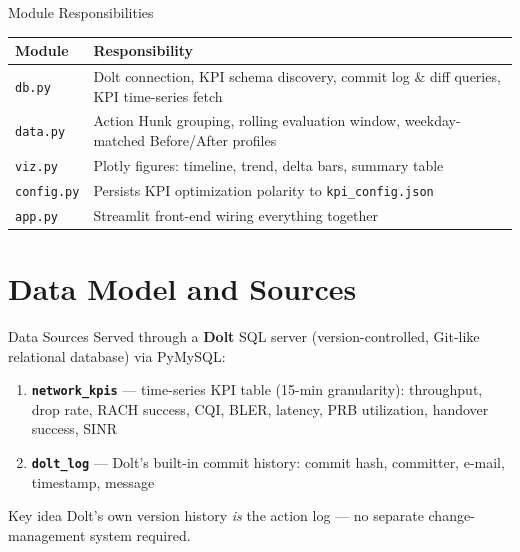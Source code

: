 \documentclass[aspectratio=169]{beamer}
\begin{document}
\begin{frame}{Module Responsibilities}
    \small
    \begin{tabular}{@{}p{2.2cm}p{8.8cm}@{}}
        \toprule
        \textbf{Module} & \textbf{Responsibility} \\
        \midrule
        \texttt{db.py}     & Dolt connection, KPI schema discovery, commit
                              log \& diff queries, KPI time-series fetch \\
        \texttt{data.py}   & Action Hunk grouping, rolling evaluation
                              window, weekday-matched Before/After
                              profiles \\
        \texttt{viz.py}    & Plotly figures: timeline, trend, delta bars,
                              summary table \\
        \texttt{config.py} & Persists KPI optimization polarity to
                              \texttt{kpi\_config.json} \\
        \texttt{app.py}    & Streamlit front-end wiring everything
                              together \\
        \bottomrule
    \end{tabular}
\end{frame}

\section{Data Model and Sources}

\begin{frame}{Data Sources}
    Served through a \textbf{Dolt} SQL server (version-controlled,
    Git-like relational database) via PyMySQL:
    \begin{enumerate}
        \item \textbf{\texttt{network\_kpis}} --- time-series KPI table
              (15-min granularity): throughput, drop rate, RACH success,
              CQI, BLER, latency, PRB utilization, handover success, SINR
        \item \textbf{\texttt{dolt\_log}} --- Dolt's built-in commit
              history: commit hash, committer, e-mail, timestamp, message
    \end{enumerate}
    \vspace{0.5em}
    \begin{alertblock}{Key idea}
        Dolt's own version history \emph{is} the action log --- no
        separate change-management system required.
    \end{alertblock}
\end{frame}
\end{document}
